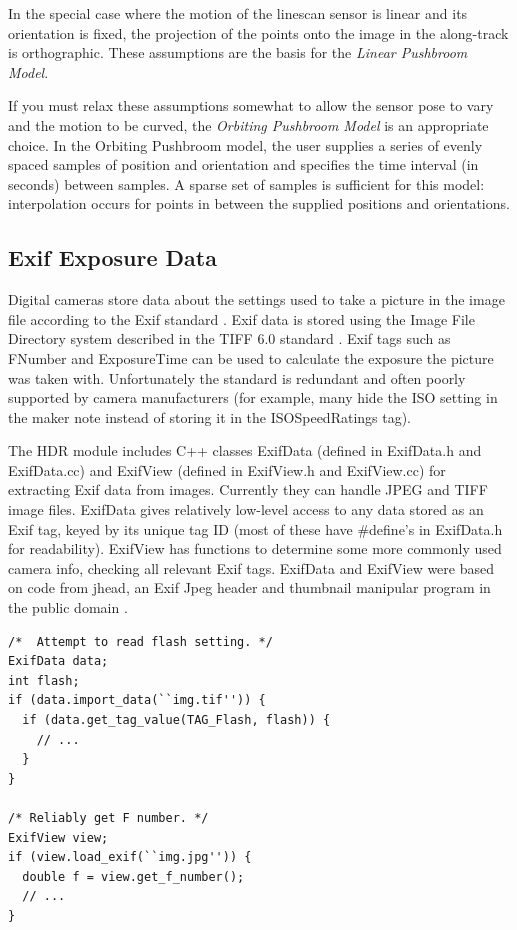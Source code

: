 In the special case where the motion of the linescan sensor is linear
and its orientation is fixed, the projection of the points onto the
image in the along-track is orthographic.  These assumptions are the
basis for the {\em Linear Pushbroom Model}.  

If you must relax these assumptions somewhat to allow the sensor pose
to vary and the motion to be curved, the {\em Orbiting Pushbroom
  Model} is an appropriate choice.  In the Orbiting Pushbroom model,
the user supplies a series of evenly spaced samples of position and
orientation and specifies the time interval (in seconds) between
samples.  A sparse set of samples is sufficient for this model:
interpolation occurs for points in between the supplied positions and
orientations.



\subsection{Exif Exposure Data}
Digital cameras store data about the settings used to take a picture
in the image file according to the Exif standard \cite{exif}. Exif
data is stored using the Image File Directory system described in the
TIFF 6.0 standard \cite{tiff}.  Exif tags such as FNumber and
ExposureTime can be used to calculate the exposure the picture was
taken with. Unfortunately the standard is redundant and often poorly
supported by camera manufacturers (for example, many hide the ISO
setting in the maker note instead of storing it in the ISOSpeedRatings
tag).

The HDR module includes C++ classes ExifData (defined in ExifData.h and ExifData.cc) and
ExifView (defined in ExifView.h and ExifView.cc) for extracting Exif data from images.
Currently they can handle JPEG and TIFF image files. ExifData gives relatively low-level
access to any data stored as an Exif tag, keyed by its unique tag ID (most of these have
\#define's in ExifData.h for readability). ExifView has functions to determine some more
commonly used camera info, checking all relevant Exif tags. ExifData and ExifView were
based on code from jhead, an Exif Jpeg header and thumbnail manipular program in the
public domain \cite{jhead}.

\begin{verbatim}
/*  Attempt to read flash setting. */
ExifData data;
int flash;
if (data.import_data(``img.tif'')) {
  if (data.get_tag_value(TAG_Flash, flash)) {
    // ...
  }
}

/* Reliably get F number. */
ExifView view;
if (view.load_exif(``img.jpg'')) {
  double f = view.get_f_number();
  // ...
}
\end{verbatim}

